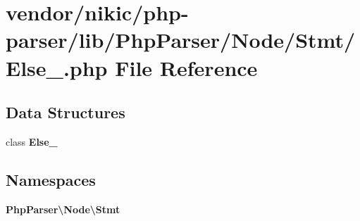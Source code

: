 \section{vendor/nikic/php-\/parser/lib/\+Php\+Parser/\+Node/\+Stmt/\+Else\+\_\+.php File Reference}
\label{_else___8php}
\subsection*{Data Structures}
\begin{DoxyCompactItemize}
\item 
class {\bf Else\+\_\+}
\end{DoxyCompactItemize}
\subsection*{Namespaces}
\begin{DoxyCompactItemize}
\item 
 {\bf Php\+Parser\textbackslash{}\+Node\textbackslash{}\+Stmt}
\end{DoxyCompactItemize}
